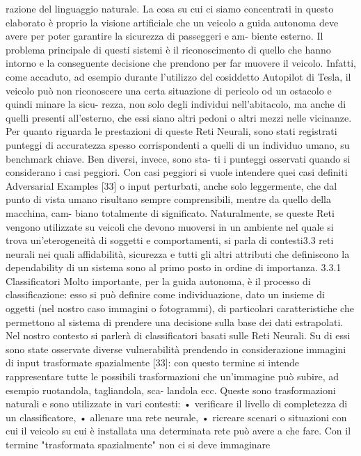 \documentclass[14pt]{extarticle}
\begin{document}
\begin{itemize}
razione del linguaggio naturale. La cosa su cui ci siamo concentrati in
questo elaborato è proprio la visione artificiale che un veicolo a guida
autonoma deve avere per poter garantire la sicurezza di passeggeri e am-
biente esterno. Il problema principale di questi sistemi è il riconoscimento
di quello che hanno intorno e la conseguente decisione che prendono
per far muovere il veicolo. Infatti, come accaduto, ad esempio durante
l’utilizzo del cosiddetto Autopilot di Tesla, il veicolo può non riconoscere
una certa situazione di pericolo od un ostacolo e quindi minare la sicu-
rezza, non solo degli individui nell’abitacolo, ma anche di quelli presenti
all’esterno, che essi siano altri pedoni o altri mezzi nelle vicinanze.
Per quanto riguarda le prestazioni di queste Reti Neurali, sono stati
registrati punteggi di accuratezza spesso corrispondenti a quelli di un
individuo umano, su benchmark chiave. Ben diversi, invece, sono sta-
ti i punteggi osservati quando si considerano i casi peggiori. Con casi
peggiori si vuole intendere quei casi definiti Adversarial Examples [33] o
input perturbati, anche solo leggermente, che dal punto di vista umano
risultano sempre comprensibili, mentre da quello della macchina, cam-
biano totalmente di significato. Naturalmente, se queste Reti vengono
utilizzate su veicoli che devono muoversi in un ambiente nel quale si
trova un’eterogeneità di soggetti e comportamenti, si parla di contesti3.3 reti neurali
nei quali affidabilità, sicurezza e tutti gli altri attributi che definiscono la
dependability di un sistema sono al primo posto in ordine di importanza.
3.3.1
Classificatori
Molto importante, per la guida autonoma, è il processo di classificazione:
esso si può definire come individuazione, dato un insieme di oggetti
(nel nostro caso immagini o fotogrammi), di particolari caratteristiche
che permettono al sistema di prendere una decisione sulla base dei dati
estrapolati. Nel nostro contesto si parlerà di classificatori basati sulle Reti
Neurali. Su di essi sono state osservate diverse vulnerabilità prendendo
in considerazione immagini di input trasformate spazialmente [33]: con
questo termine si intende rappresentare tutte le possibili trasformazioni
che un’immagine può subire, ad esempio ruotandola, tagliandola, sca-
landola ecc. Queste sono trasformazioni naturali e sono utilizzate in vari
contesti:
• verificare il livello di completezza di un classificatore,
• allenare una rete neurale,
• ricreare scenari o situazioni con cui il veicolo su cui è installata una
determinata rete può avere a che fare.
Con il termine "trasformata spazialmente" non ci si deve immaginare

\end{itemize}
\end{document}
